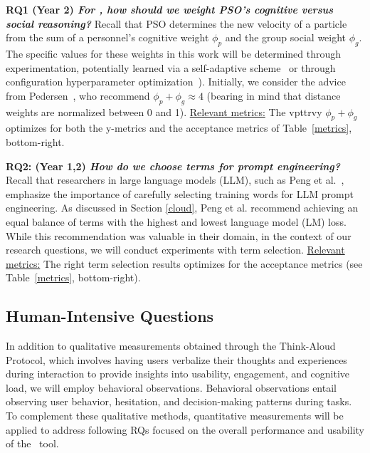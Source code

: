 {\bf RQ1 (Year 2)  {\em For \IT, how should we weight PSO's cognitive versus social reasoning?} }
   Recall that PSO determines the new velocity of a particle from the sum of a personnel's cognitive weight
    $\phi_p$ and the group social weight  $\phi_g$.
    The specific values for these weights in this work will be determined through experimentation, potentially learned via a self-adaptive scheme~\cite{harrison2018self}
or through configuration hyperparameter optimization~\cite{8469102}). Initially, we consider the advice from Pedersen~\cite{pedersen2010good}, who recommend  $\phi_p+\phi_g \approx 4$ (bearing in mind that distance weights are normalized between 0 and 1). 
\underline{ Relevant metrics:} The vpttrvy $\phi_p+\phi_g$ optimizes for both the 
  y-metrics and
the acceptance metrics of   Table~\ref{metrics}, bottom-right.


{\bf RQ2: (Year 1,2) {\em How do we choose terms for prompt engineering?}} Recall that researchers in large language models (LLM), such as Peng et al.~\cite{peng2022godel}, emphasize the importance of carefully selecting training words for LLM prompt engineering. As discussed in Section \ref{cloud}, Peng et al. recommend achieving an equal balance of terms with the highest and lowest language model (LM) loss. While this recommendation was valuable in their domain, in the context of our research questions, we will conduct experiments with term selection.
  \underline{Relevant metrics:} The right term selection results optimizes for  
the acceptance metrics (see Table~\ref{metrics}, bottom-right). 

\subsection{{Human-Intensive} Questions}
In addition to qualitative measurements obtained through the Think-Aloud Protocol, which involves having users verbalize their thoughts and experiences during interaction to provide insights into usability, engagement, and cognitive load, we will employ behavioral observations. Behavioral observations entail observing user behavior, hesitation, and decision-making patterns during tasks. To complement these qualitative methods, quantitative measurements will be applied to address following RQs focused on the overall performance and usability of the \IT~tool.

